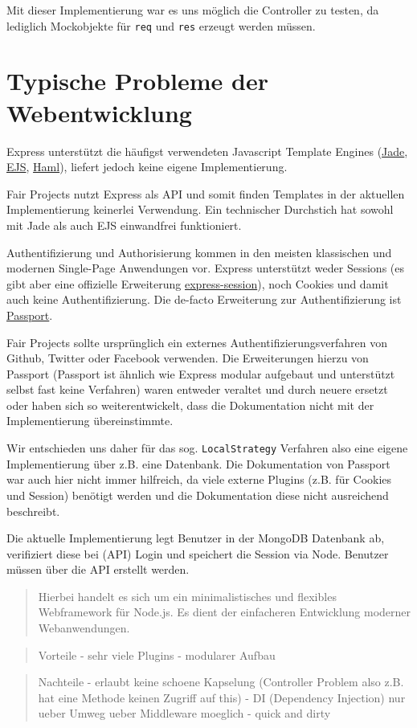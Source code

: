 Mit dieser Implementierung war es uns möglich die Controller zu testen,
da lediglich Mockobjekte für \texttt{req} und \texttt{res} erzeugt
werden müssen.

\section{Typische Probleme der
Webentwicklung}\label{typische-probleme-der-webentwicklung}

Express unterstützt die häufigst verwendeten Javascript Template Engines
(\href{http://github.com/visionmedia/jade}{Jade},
\href{http://github.com/visionmedia/ejs}{EJS},
\href{http://github.com/visionmedia/haml.js}{Haml}), liefert jedoch
keine eigene Implementierung.

Fair Projects nutzt Express als API und somit finden Templates in der
aktuellen Implementierung keinerlei Verwendung. Ein technischer
Durchstich hat sowohl mit Jade als auch EJS einwandfrei funktioniert.

Authentifizierung und Authorisierung kommen in den meisten klassischen
und modernen Single-Page Anwendungen vor. Express unterstützt weder
Sessions (es gibt aber eine offizielle Erweiterung
\href{https://github.com/expressjs/session}{express-session}), noch
Cookies und damit auch keine Authentifizierung. Die de-facto Erweiterung
zur Authentifizierung ist \href{http://passportjs.org/}{Passport}.

Fair Projects sollte ursprünglich ein externes
Authentifizierungsverfahren von Github, Twitter oder Facebook verwenden.
Die Erweiterungen hierzu von Passport (Passport ist ähnlich wie Express
modular aufgebaut und unterstützt selbst fast keine Verfahren) waren
entweder veraltet und durch neuere ersetzt oder haben sich so
weiterentwickelt, dass die Dokumentation nicht mit der Implementierung
übereinstimmte.

Wir entschieden uns daher für das sog. \texttt{LocalStrategy} Verfahren
also eine eigene Implementierung über z.B. eine Datenbank. Die
Dokumentation von Passport war auch hier nicht immer hilfreich, da viele
externe Plugins (z.B. für Cookies und Session) benötigt werden und die
Dokumentation diese nicht ausreichend beschreibt.

Die aktuelle Implementierung legt Benutzer in der MongoDB Datenbank ab,
verifiziert diese bei (API) Login und speichert die Session via Node.
Benutzer müssen über die API erstellt werden.

\begin{quote}
Hierbei handelt es sich um ein minimalistisches und flexibles
Webframework für Node.js. Es dient der einfacheren Entwicklung moderner
Webanwendungen.
\end{quote}

\begin{quote}
Vorteile - sehr viele Plugins - modularer Aufbau
\end{quote}

\begin{quote}
Nachteile - erlaubt keine schoene Kapselung (Controller Problem also
z.B. hat eine Methode keinen Zugriff auf this) - DI (Dependency
Injection) nur ueber Umweg ueber Middleware moeglich - quick and dirty
\end{quote}